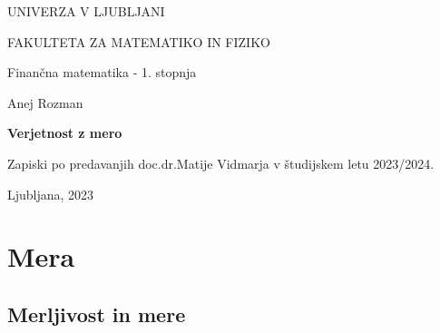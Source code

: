 \documentclass[a4paper,12pt]{article}
\theoremstyle{definition} %
\theoremstyle{plain} %
\begin{document}
\begin{titlepage}
    UNIVERZA V LJUBLJANI
  
    FAKULTETA ZA MATEMATIKO IN FIZIKO
  
    \vspace{0.5cm}
    Finančna matematika - 1. stopnja
  
    \begin{center}
        \vspace{7cm}
            Anej Rozman
  
        \vspace{0.4cm}
        \textbf{\Large{Verjetnost z mero}}
        \vspace{0.3cm}
  
        Zapiski po predavanjih doc.\@ dr.\@ Matije Vidmarja v študijskem letu 2023/2024.
    \end{center}
    \vfill
        Ljubljana, 2023     
    \thispagestyle{empty}
\end{titlepage}

\newpage
  
\tableofcontents
   
\newpage
    
\section{Mera}
    \subsection{Merljivost in mere}
\end{document}

